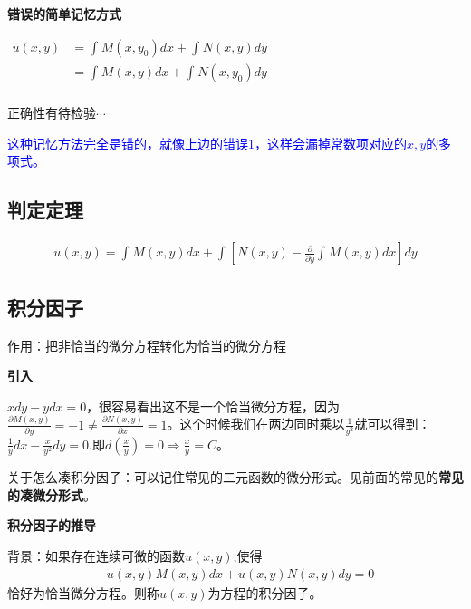 \documentclass[fontset=windows]{article}
\begin{document}
    \textbf{错误的简单记忆方式}

    $
        \begin{aligned}
            u(x,y)&=\int_{}^{}{M(x,y_0) dx}+\int_{}^{}{N(x,y) dy}\nonumber \\
            &=\int_{}^{}{M(x,y) dx}+\int_{}^{}{N(x,y_0) dy}\nonumber \\
        \end{aligned} 
    $

    正确性有待检验$\cdots$

    \textcolor{blue}{这种记忆方法完全是错的，就像上边的错误1，这样会漏掉常数项对应的$x,y$的多项式。}
    \subsection{判定定理}
    \begin{tcolorbox}[colback=blue!5!white,colframe=blue!75!black,title=判定定理]
    \begin{align}   
       u(x, y) = \int_{}^{}{M(x, y) dx} + \int_{}^{}{[N(x, y)-\frac{\partial}{\partial y}\int_{}^{}{M(x, y) dx}] dy}\nonumber 
    \end{align}         
    \end{tcolorbox} 
    

    \subsection{积分因子}
    作用：把非恰当的微分方程转化为恰当的微分方程
    
    \textbf{引入}

    $xdy-ydx=0$，很容易看出这不是一个恰当微分方程，因为$\frac{\partial M(x, y)}{\partial y}=-1\neq \frac{\partial N(x, y)}{\partial x}=1$。这个时候我们在两边同时乘以$\frac{1}{y^2}$就可以得到：$\frac{1}{y}dx-\frac{x}{y^2}dy=0$.即$d(\frac{x}{y})=0\Longrightarrow \frac{x}{y}=C$。

    关于怎么凑积分因子：可以记住常见的二元函数的微分形式。见前面的常见的\textbf{常见的凑微分形式}。

    \textbf{积分因子的推导}

    背景：如果存在连续可微的函数$u(x, y)$,使得 
    \begin{align}
        &u(x, y)M(x, y)dx + u(x, y)N(x, y)dy=0\nonumber
    \end{align}
    恰好为恰当微分方程。则称$u(x, y)$为方程的积分因子。
\end{document}
